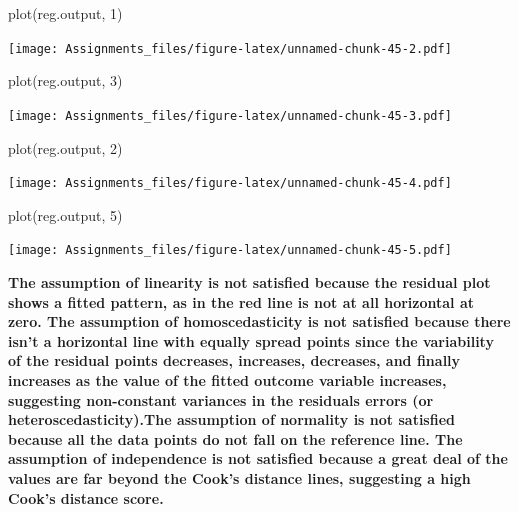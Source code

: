\documentclass[
]{article}
\newenvironment{Shaded}{\begin{snugshade}}{\end{snugshade}}
\newcommand{\DecValTok}[1]{\textcolor[rgb]{0.00,0.00,0.81}{#1}}
\newcommand{\FunctionTok}[1]{\textcolor[rgb]{0.00,0.00,0.00}{#1}}
\newcommand{\NormalTok}[1]{#1}
\begin{document}
\begin{Shaded}
\begin{Highlighting}[]
\FunctionTok{plot}\NormalTok{(reg.output, }\DecValTok{1}\NormalTok{)}
\end{Highlighting}
\end{Shaded}

\texttt{[image: Assignments\_files/figure-latex/unnamed-chunk-45-2.pdf]}

\begin{Shaded}
\begin{Highlighting}[]
\FunctionTok{plot}\NormalTok{(reg.output, }\DecValTok{3}\NormalTok{)}
\end{Highlighting}
\end{Shaded}

\texttt{[image: Assignments\_files/figure-latex/unnamed-chunk-45-3.pdf]}

\begin{Shaded}
\begin{Highlighting}[]
\FunctionTok{plot}\NormalTok{(reg.output, }\DecValTok{2}\NormalTok{)}
\end{Highlighting}
\end{Shaded}

\texttt{[image: Assignments\_files/figure-latex/unnamed-chunk-45-4.pdf]}

\begin{Shaded}
\begin{Highlighting}[]
\FunctionTok{plot}\NormalTok{(reg.output, }\DecValTok{5}\NormalTok{)}
\end{Highlighting}
\end{Shaded}

\texttt{[image: Assignments\_files/figure-latex/unnamed-chunk-45-5.pdf]}

\textbf{The assumption of linearity is not satisfied because the
residual plot shows a fitted pattern, as in the red line is not at all
horizontal at zero. The assumption of homoscedasticity is not satisfied
because there isn't a horizontal line with equally spread points since
the variability of the residual points decreases, increases, decreases,
and finally increases as the value of the fitted outcome variable
increases, suggesting non-constant variances in the residuals errors (or
heteroscedasticity).The assumption of normality is not satisfied because
all the data points do not fall on the reference line. The assumption of
independence is not satisfied because a great deal of the values are far
beyond the Cook's distance lines, suggesting a high Cook's distance
score.}
\end{document}
